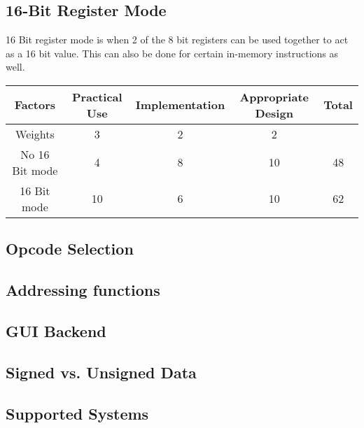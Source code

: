 \documentclass[conference]{IEEEtran}
\begin{document}
\subsection{16-Bit Register Mode}
16 Bit register mode is when 2 of the 8 bit registers can be used together to act as a 16 bit value. This can also be done for certain in-memory instructions as well. 

\begin{center}
 \begin{tabularx}{\textwidth}{||c|c|c|c|c||}
 \hline
 Factors & Practical Use & Implementation & Appropriate Design & \cellcolor{blue!40}Total\\ [0.5ex] 
 \hline\hline
 Weights & 3 & 2 & 2& \\ 
 \hline
 No 16 Bit mode & 4 &  8&  10 & \cellcolor{blue!25}48\\
 \hline
 16 Bit mode &  10 & 6 &  10 & \cellcolor{blue!25}62\\
 \hline
\end{tabularx}
\end{center}



\subsection{Opcode Selection}
\subsection{Addressing functions}
\subsection{GUI Backend}
\subsection{Signed vs. Unsigned Data}
\subsection{Supported Systems}
\end{document}

